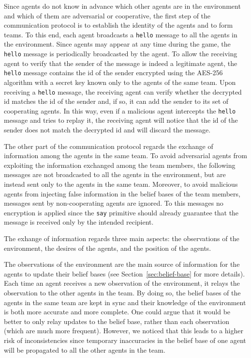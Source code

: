 Since agents do not know in advance which other agents are in the environment and which of them are adversarial or cooperative, the first step of the communication protocol is to establish the identity of the agents and to form teams. To this end, each agent broadcasts a \texttt{hello} message to all the agents in the environment. Since agents may appear at any time during the game, the \texttt{hello} message is periodically broadcasted by the agent. To allow the receiving agent to verify that the sender of the message is indeed a legitimate agent, the \texttt{hello} message contains the id of the sender encrypted using the AES-256 algorithm with a secret key known only to the agents of the same team. Upon receiving a \texttt{hello} message, the receiving agent can verify whether the decrypted id matches the id of the sender and, if so, it can add the sender to its set of cooperating agents. In this way, even if a malicious agent intercepts the \texttt{hello} message and tries to replay it, the receiving agent will notice that the id of the sender does not match the decrypted id and will discard the message.

The other part of the communication protocol regards the exchange of information among the agents in the same team. To avoid adversarial agents from exploiting the information exchanged among the team members, the following messages are not broadcasted to all the agents in the environment, but are instead sent only to the agents in the same team. Moreover, to avoid malicious agents from injecting false information in the belief bases of the team members, messages sent by non-cooperating agents are ignored. To this messages no encryption is applied since the \texttt{say} primitive should already guarantee that the message is received only by the intended recipient.

The exhange of information regards three main aspects: the observations of the environment, the desires of the agents, and the position of the agents.

The observations of the environment are the main source of information for the agents to update their belief bases (see Section~\ref{sec:belief-base} for more details). Each time an agent receives a new observation of the environment, it relays the observation to the other agents in the team. By doing so, the belief bases of the agents in the same team are kept in sync and their knowledge of the environment is both more accurate and more complete. One could argue that it would be better to only relay updates to the belief base, rather than each observation (which are much more frequent). However, we noticed that this leads to a higher risk of inconsistencies since temporary inaccuracies in the belief base of one agent will be propagated to all the other agents in the team.


